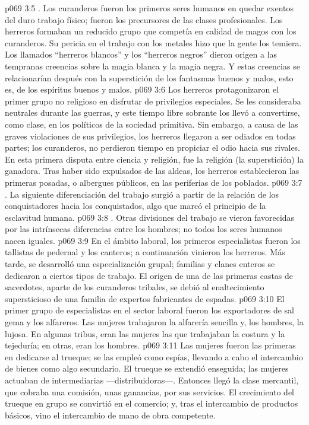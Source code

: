 \vs p069 3:5 . Los curanderos fueron los primeros seres humanos en quedar exentos del duro trabajo físico; fueron los precursores de las clases profesionales. Los herreros formaban un reducido grupo que competía en calidad de magos con los curanderos. Su pericia en el trabajo con los metales hizo que la gente los temiera. Los llamados “herreros blancos” y los “herreros negros” dieron origen a las tempranas creencias sobre la magia blanca y la magia negra. Y estas creencias se relacionarían después con la superstición de los fantasmas buenos y malos, esto es, de los espíritus buenos y malos.
\vs p069 3:6 Los herreros protagonizaron el primer grupo no religioso en disfrutar de privilegios especiales. Se les consideraba neutrales durante las guerras, y este tiempo libre sobrante los llevó a convertirse, como clase, en los políticos de la sociedad primitiva. Sin embargo, a causa de las graves violaciones de sus privilegios, los herreros llegaron a ser odiados en todas partes; los curanderos, no perdieron tiempo en propiciar el odio hacia sus rivales. En esta primera disputa entre ciencia y religión, fue la religión (la superstición) la ganadora. Tras haber sido expulsados de las aldeas, los herreros establecieron las primeras posadas, o albergues públicos, en las periferias de los poblados.
\vs p069 3:7 . La siguiente diferenciación del trabajo surgió a partir de la relación de los conquistadores hacia los conquistados, algo que marcó el principio de la esclavitud humana.
\vs p069 3:8 . Otras divisiones del trabajo se vieron favorecidas por las intrínsecas diferencias entre los hombres; no todos los seres humanos nacen iguales.
\vs p069 3:9 En el ámbito laboral, los primeros especialistas fueron los tallistas de pedernal y los canteros; a continuación vinieron los herreros. Más tarde, se desarrolló una especialización grupal; familias y clanes enteros se dedicaron a ciertos tipos de trabajo. El origen de una de las primeras castas de sacerdotes, aparte de los curanderos tribales, se debió al enaltecimiento supersticioso de una familia de expertos fabricantes de espadas.
\vs p069 3:10 \pc El primer grupo de especialistas en el sector laboral fueron los exportadores de sal gema y los alfareros. Las mujeres trabajaron la alfarería sencilla y, los hombres, la lujosa. En algunas tribus, eran las mujeres las que trabajaban la costura y la tejeduría; en otras, eran los hombres.
\vs p069 3:11 Las mujeres fueron las primeras en dedicarse al trueque; se las empleó como espías, llevando a cabo el intercambio de bienes como algo secundario. El trueque se extendió enseguida; las mujeres actuaban de intermediarias ---distribuidoras---. Entonces llegó la clase mercantil, que cobraba una comisión, unas ganancias, por sus servicios. El crecimiento del trueque en grupo se convirtió en el comercio; y, tras el intercambio de productos básicos, vino el intercambio de mano de obra competente.
